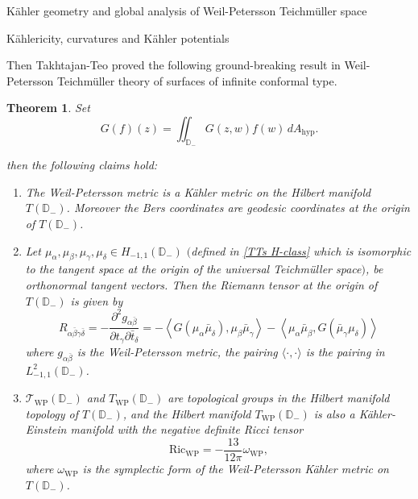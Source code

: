 \documentclass[12pt]{amsart}
\newcommand{\disk}{\ensuremath{\mathbb{D}} } %
\theoremstyle{plain}
\newtheorem{theorem}{Theorem}[section]
\theoremstyle{definition}
\theoremstyle{remark}
\numberwithin{equation}{section} %
\numberwithin{figure}{section} %
\begin{document}
\begin{section}{K\"ahler geometry and global analysis of Weil-Petersson Teichm\"uller space}
\begin{subsection}{K\"ahlericity, curvatures and K\"ahler potentials}
{Then Takhtajan-Teo \cite{Takhtajan_Teo_Memoirs} proved the following ground-breaking result in Weil-Petersson Teichm\"uller theory of surfaces of infinite conformal type.
\begin{theorem}
Set
\begin{equation}\label{resolvent}
    G(f)(z)=\iint_{\mathbb{D}_{-}} G(z, w) f(w)\, dA_{\mathrm{hyp}}.
\end{equation}

then the following claims hold:
\begin{enumerate}[font=\upshape]
    \item The Weil-Petersson metric is a Kähler metric on the Hilbert manifold $T(\disk_-)$. Moreover the Bers coordinates are geodesic coordinates at the origin of \(T(\disk_-)\).
\item Let \(\mu_{\alpha}, \mu_{\beta}, \mu_{\gamma}, \mu_{\delta} \in H_{-1,1}(\disk_-)\) $($defined in \eqref{TTs H-class} which is isomorphic to the tangent space at the origin of the universal Teichm\"uller space$)$, be orthonormal tangent vectors.
Then the Riemann tensor at the origin of $T(\disk_-)$ is given by
$$
R_{\alpha \bar{\beta} \gamma \bar{\delta}}=-\frac{\partial^{2} g_{\alpha \bar{\beta}}}{\partial t_{\gamma} \partial \bar{t}_{\delta}}=-\left\langle G\left(\mu_{\alpha} \bar{\mu}_{\delta}\right), \mu_{\beta} \bar{\mu}_{\gamma}\right\rangle-\left\langle\mu_{\alpha} \bar{\mu}_{\beta}, G\left(\bar{\mu}_{\gamma} \mu_{\delta}\right)\right\rangle
$$
where $g_{\alpha \bar{\beta}}$ is the Weil-Petersson metric, the pairing $\langle \cdot, \cdot\rangle$ is the pairing in $L^2_{-1,1}(\disk_-)$.

\item $\mathscr{T}_{\mathrm{WP}}(\disk_-)$ and \(T_{\mathrm{WP}}(\disk_-)\) are topological groups in the Hilbert manifold topology of \(T(\disk_-)\), and the Hilbert manifold \(T_{\mathrm{WP}}(\disk_-)\) is also a Kähler-Einstein manifold with the negative definite Ricci
tensor
$$
\mathrm{Ric}_{\mathrm{W P}}=-\frac{13}{12 \pi} \omega_{\mathrm{W P}},
$$
where $\omega_{\mathrm{WP}}$ is the symplectic form of the Weil-Petersson Kähler metric on $T(\disk_-)$.
\end{enumerate}
 
\end{theorem}}


\end{subsection}
\end{section}
\end{document}
